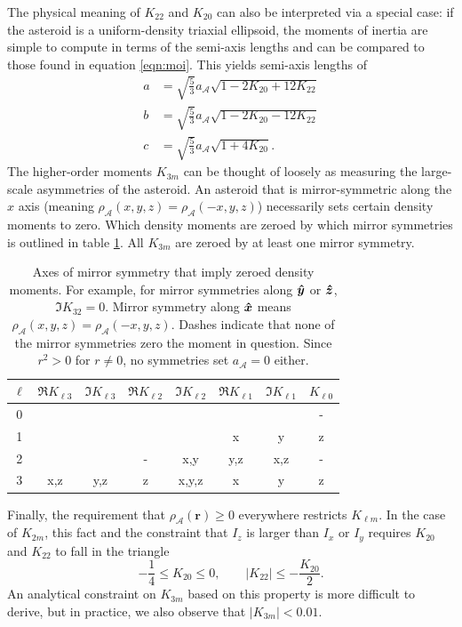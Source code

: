 The physical meaning of $K_{22}$ and $K_{20}$ can also be interpreted via a special case: if the asteroid is a uniform-density triaxial ellipsoid, the moments of inertia are simple to compute in terms of the semi-axis lengths and can be compared to those found in equation \ref{eqn:moi}. This yields semi-axis lengths of 
\begin{equation}
  \begin{split}
  a &= \sqrt{\frac{5}{3}}a_\mathcal{A}\sqrt{1-2K_{20}+12K_{22}}\\
  b &= \sqrt{\frac{5}{3}}a_\mathcal{A}\sqrt{1-2K_{20}-12K_{22}}\\
  c &= \sqrt{\frac{5}{3}}a_\mathcal{A}\sqrt{1+4K_{20}}.
  \label{eqn:ellipsoid-axes}
  \end{split}
\end{equation}
The higher-order moments $K_{3m}$ can be thought of loosely as measuring the large-scale asymmetries of the asteroid. An asteroid that is mirror-symmetric along the $\unit{x}$ axis (meaning $\rho_\mathcal{A}(x,y,z)=\rho_\mathcal{A}(-x,y,z)$) necessarily sets certain density moments to zero. Which density moments are zeroed by which mirror symmetries is outlined in table \ref{tab:klm-symmetries}. All $K_{3m}$ are zeroed by at least one mirror symmetry. 

\begin{table}
  \centering
  \begin{tabular}{c|ccccccc}
    \hline
    $\ell$ & $\Re K_{\ell 3}$ & $\Im K_{\ell 3}$ & $\Re K_{\ell 2}$ & $\Im K_{\ell 2}$ & $\Re K_{\ell 1}$ & $\Im K_{\ell 1}$ & $K_{\ell 0}$ \\ \hline
    0 &  &  &  &  &  &  & -\\ 
    1 &  &  &  &  & x & y & z\\ 
    2 &  &  & - & x,y & y,z & x,z & -\\ 
    3 & x,z & y,z & z & x,y,z & x & y & z\\ \hline
  \end{tabular}
  \caption{Axes of mirror symmetry that imply zeroed density moments. For example, for mirror symmetries along $\bm{\hat{y}}$ or $\bm{\hat{z}}$, $\Im K_{32}=0$. Mirror symmetry along $\bm{\hat{x}}$ means $\rho_\mathcal{A}(x, y, z) = \rho_\mathcal{A}(-x, y, z)$. Dashes indicate that none of the mirror symmetries zero the moment in question. Since $r^2>0$ for $r\neq 0$, no symmetries set $a_\mathcal{A}=0$ either.}
  \label{tab:klm-symmetries}
\end{table} 

Finally, the requirement that $\rho_\mathcal{A}(\bm r) \geq 0$ everywhere restricts $K_{\ell m}$. In the case of $K_{2m}$, this fact and the constraint that $I_z$ is larger than $I_x$ or $I_y$ requires $K_{20}$ and $K_{22}$ to fall in the triangle
\begin{equation}
  -\frac{1}{4} \leq K_{20} \leq 0, \qquad |K_{22}| \leq -\frac{K_{20}}{2}.
  \label{eqn:parameter-bounds}
\end{equation}
An analytical constraint on $K_{3m}$ based on this property is more difficult to derive, but in practice, we also observe that $|K_{3m}| < 0.01$.




